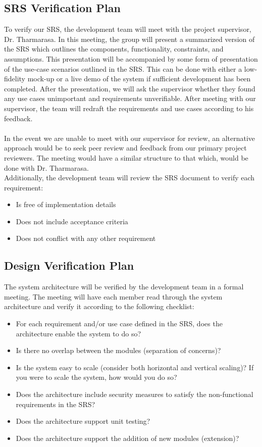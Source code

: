\documentclass[12pt, titlepage]{article}
\begin{document}
\subsection{SRS Verification Plan}
\label{section:SRSVerificationPlan}
To verify our SRS, the development team will meet with the project supervisor, Dr. Tharmarasa. In this meeting, the group will present a summarized version of the SRS which outlines the components, functionality, constraints, and assumptions. This presentation will be accompanied by some form of presentation of the use-case scenarios outlined in the SRS. This can be done with either a low-fidelity mock-up or a live demo of the system if sufficient development has been completed. After the presentation, we will ask the supervisor whether they found any use cases unimportant and requirements unverifiable. After meeting with our supervisor, the team will redraft the requirements and use cases according to his feedback. \\\\
In the event we are unable to meet with our supervisor for review, an alternative approach would be to seek peer review and feedback from our primary project reviewers. The meeting would have a similar structure to that which, would be done with Dr. Tharmarasa. \\

Additionally, the development team will review the SRS document to verify each requirement:
\begin{itemize}
\item Is free of implementation details
\item Does not include acceptance criteria
\item Does not conflict with any other requirement
\end{itemize}


\subsection{Design Verification Plan}
The system architecture will be verified by the development team in a formal meeting. The meeting will have each member read through the system architecture and verify it according to the following checklist:
\begin{itemize}
\item For each requirement and/or use case defined in the SRS, does the architecture enable the system to do so?
\item Is there no overlap between the modules (separation of concerns)?
\item Is the system easy to scale (consider both horizontal and vertical scaling)? If you were to scale the system, how would you do so?
\item Does the architecture include security measures to satisfy the non-functional requirements in the SRS?
\item Does the architecture support unit testing?
\item Does the architecture support the addition of new modules (extension)? 
\end{itemize}
\end{document}
